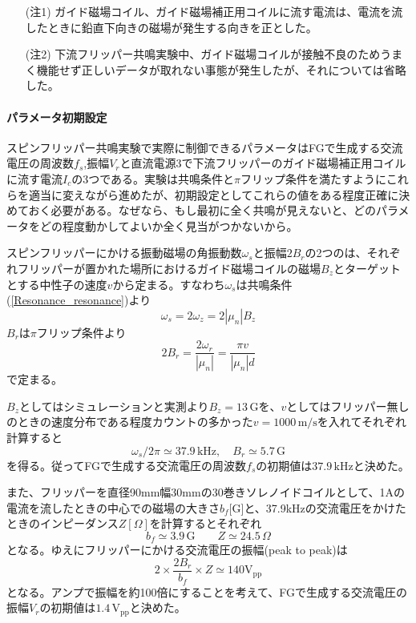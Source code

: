 \begin{itemize}
\item[(注$\!\!$1)] ガイド磁場コイル、ガイド磁場補正用コイルに流す電流は、電流を流したときに鉛直下向きの磁場が発生する向きを正とした。
\item[(注$\!\!$2)] 下流フリッパー共鳴実験中、ガイド磁場コイルが接触不良のためうまく機能せず正しいデータが取れない事態が発生したが、それについては省略した。
\end{itemize}

\paragraph{パラメータ初期設定}
スピンフリッパー共鳴実験で実際に制御できるパラメータはFGで生成する交流電圧の周波数$f_s$,振幅$V_r$と直流電源3で下流フリッパーのガイド磁場補正用コイルに流す電流$I_c$の3つである。実験は共鳴条件と$\pi$フリップ条件を満たすようにこれらを適当に変えながら進めたが、初期設定としてこれらの値をある程度正確に決めておく必要がある。なぜなら、もし最初に全く共鳴が見えないと、どのパラメータをどの程度動かしてよいか全く見当がつかないから。

スピンフリッパーにかける振動磁場の角振動数$\omega_s$と振幅$2B_r$の2つのは、それぞれフリッパーが置かれた場所におけるガイド磁場コイルの磁場$B_z$とターゲットとする中性子の速度$v$から定まる。すなわち$\omega_s$は共鳴条件(\ref{Resonance_resonance})より
\begin{equation}
\omega_s = 2\omega_z =2 |\mu_n|B_z
\end{equation}
$B_r$は$\pi$フリップ条件より
\begin{equation}
2B_r =\frac{2 \omega_r}{|\mu_n|} =\frac{\pi v}{|\mu_n|d}
\end{equation}
で定まる。

$B_z$としてはシミュレーションと実測より$B_z=13 \, \mathrm{G}$を、$v$としてはフリッパー無しのときの速度分布である程度カウントの多かった$v=1000\, \mathrm{m/s}$を入れてそれぞれ計算すると
\begin{equation}
\omega_s/2\pi\simeq 37.9\, \mathrm{kHz}, \quad B_r\simeq 5.7 \, \mathrm{G}
\end{equation}
を得る。従ってFGで生成する交流電圧の周波数$f_s$の初期値は$37.9\,\mathrm{kHz}$と決めた。

また、フリッパーを直径90mm幅30mmの30巻きソレノイドコイルとして、1Aの電流を流したときの中心での磁場の大きさ$b_f$[G]と、37.9kHzの交流電圧をかけたときのインピーダンス$Z[\Omega]$を計算するとそれぞれ
\begin{equation}
b_f\simeq 3.9 \,\mathrm{G} \qquad Z \simeq 24.5 \,\Omega
\end{equation}
となる。ゆえにフリッパーにかける交流電圧の振幅(peak to peak)は
\[2 \times \frac{2B_r}{b_f} \times Z \simeq 140 \mathrm{V_{pp}}\]
となる。アンプで振幅を約100倍にすることを考えて、FGで生成する交流電圧の振幅$V_r$の初期値は$1.4 \,\mathrm{V_{pp}}$と決めた。

